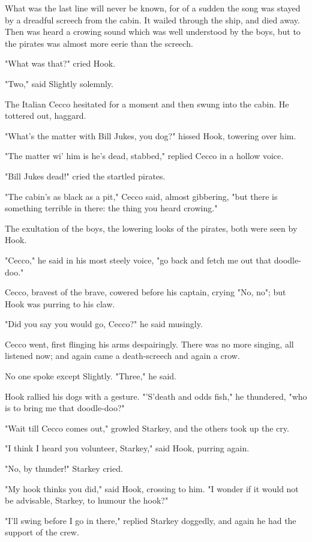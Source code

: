 What was the last line will never be known, for of a sudden the song was
stayed by a dreadful screech from the cabin. It wailed through the ship,
and died away. Then was heard a crowing sound which was well understood by
the boys, but to the pirates was almost more eerie than the screech.


"What was that?" cried Hook.


"Two," said Slightly solemnly.


The Italian Cecco hesitated for a moment and then swung into the cabin. He
tottered out, haggard.


"What's the matter with Bill Jukes, you dog?" hissed Hook, towering over
him.


"The matter wi' him is he's dead, stabbed," replied Cecco in a hollow
voice.


"Bill Jukes dead!" cried the startled pirates.


"The cabin's as black as a pit," Cecco said, almost gibbering, "but there
is something terrible in there: the thing you heard crowing."


The exultation of the boys, the lowering looks of the pirates, both were
seen by Hook.


"Cecco," he said in his most steely voice, "go back and fetch me out that
doodle-doo."


Cecco, bravest of the brave, cowered before his captain, crying "No, no";
but Hook was purring to his claw.


"Did you say you would go, Cecco?" he said musingly.


Cecco went, first flinging his arms despairingly. There was no more
singing, all listened now; and again came a death-screech and again a
crow.


No one spoke except Slightly. "Three," he said.


Hook rallied his dogs with a gesture. "'S'death and odds fish," he
thundered, "who is to bring me that doodle-doo?"


"Wait till Cecco comes out," growled Starkey, and the others took up the
cry.


"I think I heard you volunteer, Starkey," said Hook, purring again.


"No, by thunder!" Starkey cried.


"My hook thinks you did," said Hook, crossing to him. "I wonder if it
would not be advisable, Starkey, to humour the hook?"


"I'll swing before I go in there," replied Starkey doggedly, and again he
had the support of the crew.


